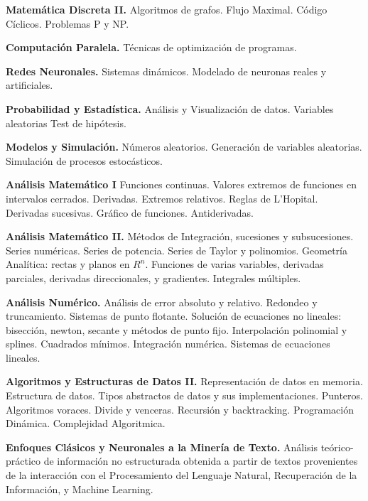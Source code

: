 \documentclass[]{resume-openfont}
\begin{document}
    \textbf{Matemática Discreta II.} Algoritmos de grafos. Flujo Maximal. Código
    Cíclicos. Problemas P y NP.

    \textbf{Computación Paralela.} Técnicas de optimización de programas.
    
    \textbf{Redes Neuronales.} Sistemas dinámicos. Modelado de neuronas reales y
    artificiales.

    \textbf{Probabilidad y Estadística.} Análisis y Visualización de datos.
    Variables aleatorias Test de hipótesis.

    \textbf{Modelos y Simulación.} Números aleatorios. Generación de variables
    aleatorias. Simulación de procesos estocásticos.

    \textbf{Análisis Matemático I} Funciones continuas. Valores extremos de
    funciones en intervalos cerrados. Derivadas. Extremos relativos. Reglas de
    L'Hopital. Derivadas sucesivas. Gráfico de funciones. Antiderivadas.

    \textbf{Análisis Matemático II.} Métodos de Integración, sucesiones y
    subsucesiones. Series numéricas. Series de potencia. Series de Taylor y
    polinomios. Geometría Analítica: rectas y planos en $R^n$. Funciones de
    varias variables, derivadas parciales, derivadas direccionales, y gradientes.
    Integrales múltiples.

    \textbf{Análisis Numérico.} Análisis de error absoluto y relativo. Redondeo
    y truncamiento. Sistemas de punto flotante. Solución de ecuaciones no
    lineales: bisección, newton, secante y métodos de punto fijo. Interpolación
    polinomial y splines. Cuadrados mínimos. Integración numérica. Sistemas de
    ecuaciones lineales.

    \textbf{Algoritmos y Estructuras de Datos II.} Representación de datos en
    memoria. Estructura de datos. Tipos abstractos de datos y sus
    implementaciones. Punteros. Algoritmos voraces. Divide y venceras. Recursión
    y backtracking. Programación Dinámica. Complejidad Algoritmica.


    \textbf{Enfoques Clásicos y Neuronales a la Minería de Texto.}
    Análisis teórico-práctico de información no estructurada obtenida a partir
    de textos provenientes de la interacción con el Procesamiento del Lenguaje
    Natural, Recuperación de la Información, y Machine Learning.
\end{document}
